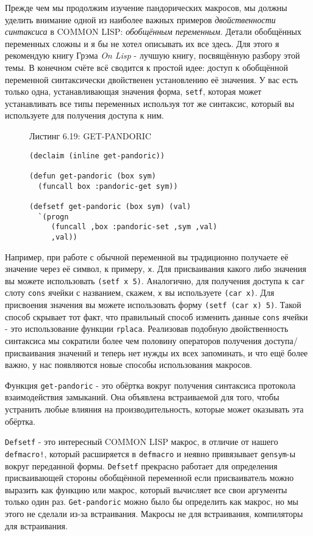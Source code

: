 Прежде чем мы продолжим изучение пандорических макросов, мы должны уделить внимание одной из наиболее важных примеров \emph{двойственности синтаксиса} в COMMON LISP: \emph{обобщённым переменным}. Детали обобщённых переменных сложны и я бы не хотел описывать их все здесь. Для этого я рекомендую книгу Грэма \emph{On Lisp} - лучшую книгу, посвящённую разбору этой темы. В конечном счёте всё сводится к простой идее: доступ к обобщённой переменной синтаксически двойственен установлению её значения. У вас есть только одна, устанавливающая значения форма, \verb"setf", которая может устанавливать все типы переменных используя тот же синтаксис, который вы используете для получения доступа к ним.

\begin{figure}Листинг 6.19: GET-PANDORIC\label{listing_6.19}
\listbegin
\begin{verbatim}
(declaim (inline get-pandoric))

(defun get-pandoric (box sym)
  (funcall box :pandoric-get sym))

(defsetf get-pandoric (box sym) (val)
  `(progn
     (funcall ,box :pandoric-set ,sym ,val)
     ,val))
\end{verbatim}
\listend
\end{figure}

Например, при работе с обычной переменной вы традиционно получаете её значение через её символ, к примеру, \verb"x". Для присваивания какого либо значения вы можете использовать \verb"(setf x 5)". Аналогично, для получения доступа к \verb"car" слоту \verb"cons" ячейки с названием, скажем, \verb"x" вы используете \verb"(car x)". Для присвоения значения вы можете использовать форму \verb"(setf (car x) 5)". Такой способ скрывает тот факт, что правильный способ изменить данные \verb"cons" ячейки - это использование функции \verb"rplaca". Реализовав подобную двойственность синтаксиса мы сократили более чем половину операторов получения доступа/присваивания значений и теперь нет нужды их всех запоминать, и что ещё более важно, у нас появляются новые способы использования макросов.

Функция \verb"get-pandoric" - это обёртка вокруг получения синтаксиса протокола взаимодействия замыканий. Она объявлена встраиваемой для того, чтобы устранить любые влияния на производительность, которые может оказывать эта обёртка.

\verb"Defsetf" - это интересный COMMON LISP макрос, в отличие от нашего \verb"defmacro!", который расширяется в \verb"defmacro" и неявно привязывает \verb"gensym"-ы вокруг переданной формы. \verb"Defsetf" прекрасно работает для определения присваивающей стороны обобщённой переменной если присваиватель можно выразить как функцию или макрос, который вычисляет все свои аргументы только один раз. \verb"Get-pandoric" можно было бы определить как макрос, но мы этого не сделали из-за встраивания. Макросы не для встраивания, компиляторы для встраивания.

